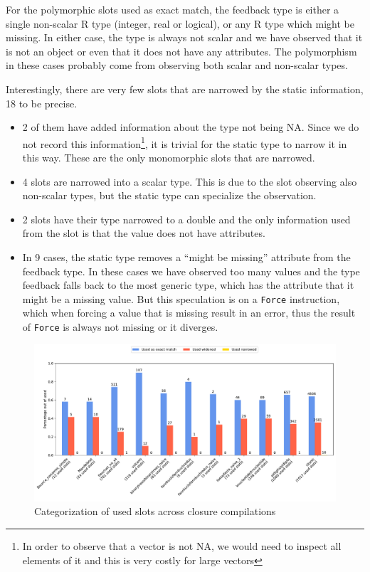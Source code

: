 For the polymorphic slots used as exact match, the feedback type is either a single non-scalar R type (integer, real or logical), or any R type which might be missing. In either case, the type is always not scalar and we have observed that it is not an object or even that it does not have any attributes. The polymorphism in these cases probably come from observing both scalar and non-scalar types.

Interestingly, there are very few slots that are narrowed by the static information, 18 to be precise.

\begin{itemize}
	\item{} 2 of them have added information about the type not being NA. Since we do not record this information\footnote{In order to observe that a vector is not NA, we would need to inspect all elements of it and this is very costly for large vectors}, it is trivial for the static type to narrow it in this way. These are the only monomorphic slots that are narrowed.
	\item{} 4 slots are narrowed into a scalar type. This is due to the slot observing also non-scalar types, but the static type can specialize the observation.
	\item{} 2 slots have their type narrowed to a double and the only information used from the slot is that the value does not have attributes.
	\item{} In 9 cases, the static type removes a \enquote{might be missing} attribute from the feedback type. In these cases we have observed too many values and the type feedback falls back to the most generic type, which has the attribute that it might be a missing value. But this speculation is on a \texttt{Force} instruction, which when forcing a value that is missing result in an error, thus the result of \texttt{Force} is always not missing or it diverges.
\end{itemize}


\begin{figure}
	\centering
	\begin{adjustwidth}{-3cm}{-3cm}
		\includegraphics[width=1.5\textwidth]{figures/used.pdf}
	\end{adjustwidth}
	\caption{Categorization of used slots across closure compilations}\label{fig:graph-used}
\end{figure}

